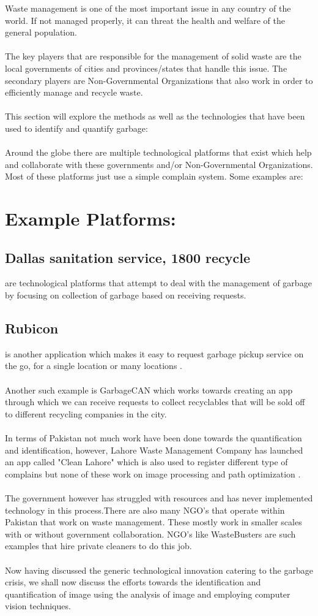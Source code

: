 Waste management is one of the most important issue in any country of the world. If not managed properly, it can threat the health and welfare of the general population.\\
\\
The key players that are responsible for the management of solid waste are the local governments of cities and provinces/states that handle this issue. The secondary players are Non-Governmental Organizations that also work in order to efficiently manage and recycle waste.\\
\\
This section will explore the methods as well as the technologies that have been used to identify and quantify garbage:\\
\\
Around the globe there are multiple technological platforms that exist which help and collaborate with these governments and/or Non-Governmental Organizations. Most of these platforms just use a simple complain system. Some examples are:
\section{Example Platforms:}
\subsection{Dallas sanitation service, 1800 recycle} are technological platforms that attempt to deal with the management of garbage by focusing on collection of garbage based on receiving requests.
\subsection{Rubicon} is another application which makes it easy to request garbage pickup service on the go, for a single location or many locations \cite{rubicon}.\\
\\
Another such example is GarbageCAN which works towards creating an app through which we can receive requests to collect recyclables that will be sold off to different recycling companies in the city.\\
\\
In terms of Pakistan not much work have been done towards the quantification and identification, however, Lahore Waste Management Company has launched an app called "Clean Lahore" which is also used to register different type of complains but none of these work on image processing and path optimization \cite{rizvi}.\\
\\
The government however has struggled with resources and has never implemented technology in this process.There are also many NGO's that operate within Pakistan that work on waste management. These mostly work in smaller scales with or without government collaboration. NGO's like WasteBusters are such examples that hire private cleaners to do this job.\\
\\
Now having discussed the generic technological innovation catering to the garbage crisis, we shall now discuss the efforts towards the identification and quantification of image using the analysis of image and employing computer vision techniques.
